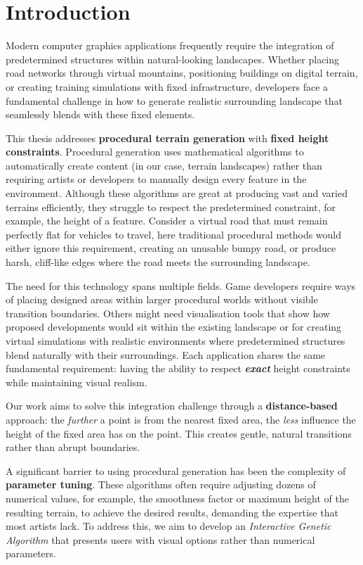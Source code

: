 \chapter*{Introduction}

Modern computer graphics applications frequently require the integration of predetermined structures within natural-looking landscapes. Whether placing road networks through virtual mountains, positioning buildings on digital terrain, or creating training simulations with fixed infrastructure, developers face a fundamental challenge in how to generate realistic surrounding landscape that seamlessly blends with these fixed elements.

This thesis addresses \textbf{procedural terrain generation} with \textbf{fixed height constraints}. Procedural generation uses mathematical algorithms to automatically create content (in our case, terrain landscapes) rather than requiring artists or developers to manually design every feature in the environment. Although these algorithms are great at producing vast and varied terrains efficiently, they struggle to respect the predetermined constraint, for example, the height of a feature. Consider a virtual road that must remain perfectly flat for vehicles to travel, here traditional procedural methods would either ignore this requirement, creating an unusable bumpy road, or produce harsh, cliff-like edges where the road meets the surrounding landscape.

The need for this technology spans multiple fields. Game developers require ways of placing designed areas within larger procedural worlds without visible transition boundaries. Others might need visualisation tools that show how proposed developments would sit within the existing landscape or for creating virtual simulations with realistic environments where predetermined structures blend naturally with their surroundings. Each application shares the same fundamental requirement: having the ability to respect \textbf{\textit{exact}} height constraints while maintaining visual realism.

Our work aims to solve this integration challenge through a \textbf{distance-based} approach: the \textit{further} a point is from the nearest fixed area, the \textit{less} influence the height of the fixed area has on the point. This creates gentle, natural transitions rather than abrupt boundaries. 

A significant barrier to using procedural generation has been the complexity of \textbf{parameter tuning}. These algorithms often require adjusting dozens of numerical values, for example, the smoothness factor or maximum height of the resulting terrain, to achieve the desired results, demanding the expertise that most artists lack. To address this, we aim to develop an \textit{Interactive Genetic Algorithm} that presents users with visual options rather than numerical parameters.

